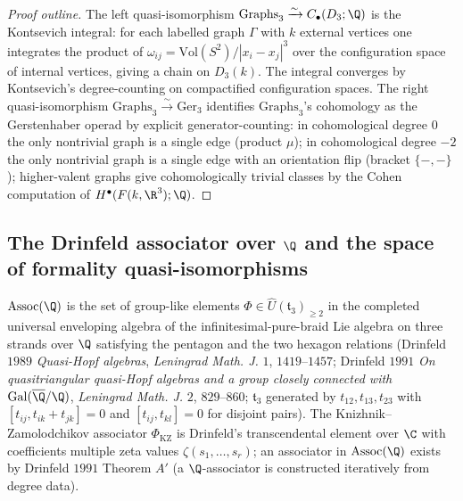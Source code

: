 \begin{proof}[Proof outline]
The left quasi-isomorphism $\mathrm{Graphs}_3 \xrightarrow{\sim}
C_\bullet(D_3; \Q)$ is the Kontsevich integral: for each labelled graph
$\Gamma$ with $k$ external vertices one integrates the product of
$\omega_{ij} = \mathrm{Vol}(S^2) / |x_i - x_j|^3$ over the
configuration space of internal vertices, giving a chain on $D_3(k)$.
The integral converges by Kontsevich's degree-counting on compactified
configuration spaces. The right quasi-isomorphism $\mathrm{Graphs}_3
\xrightarrow{\sim} \mathrm{Ger}_3$ identifies $\mathrm{Graphs}_3$'s
cohomology as the Gerstenhaber operad by explicit generator-counting:
in cohomological degree $0$ the only nontrivial graph is a single edge
(product $\mu$); in cohomological degree $-2$ the only nontrivial graph
is a single edge with an orientation flip (bracket $\{-, -\}$);
higher-valent graphs give cohomologically trivial classes by the Cohen
computation of $H^\bullet(F(k, \R^3); \Q)$.
\end{proof}

\subsection*{The Drinfeld associator over $\Q$ and the space of formality quasi-isomorphisms}

\begin{definition}
\label{def:drinfeld-associator-q}
\ClaimStatusDefinitional
$\mathrm{Assoc}(\Q)$ is the set of group-like elements
$\Phi \in \hat{U}(\mathfrak{t}_3)_{\geq 2}$ in the completed universal
enveloping algebra of the infinitesimal-pure-braid Lie algebra on three
strands over $\Q$ satisfying the pentagon and the two hexagon relations
(Drinfeld $1989$ \emph{Quasi-Hopf algebras}, \textit{Leningrad Math. J.}
$1$, $1419$--$1457$; Drinfeld $1991$ \emph{On quasitriangular
quasi-Hopf algebras and a group closely connected with
$\mathrm{Gal}(\overline{\Q}/\Q)$}, \textit{Leningrad Math. J.} $2$,
$829$--$860$; $\mathfrak{t}_3$ generated by $t_{12}, t_{13}, t_{23}$
with $[t_{ij}, t_{ik} + t_{jk}] = 0$ and $[t_{ij}, t_{kl}] = 0$ for
disjoint pairs). The Knizhnik--Zamolodchikov associator
$\Phi_{\mathrm{KZ}}$ is Drinfeld's transcendental element over $\C$
with coefficients multiple zeta values $\zeta(s_1, \ldots, s_r)$; an
associator in $\mathrm{Assoc}(\Q)$ exists by Drinfeld $1991$ Theorem $A'$
(a $\Q$-associator is constructed iteratively from degree data).
\end{definition}

